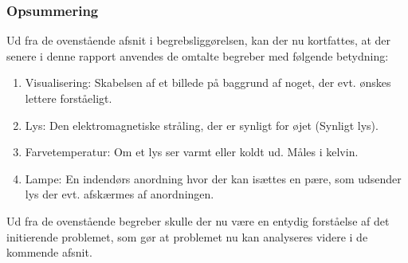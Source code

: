 
\subsubsection*{Opsummering}
Ud fra de ovenstående afsnit i begrebsliggørelsen, kan der nu kortfattes, at der senere i denne rapport anvendes de omtalte begreber med følgende betydning:
\begin{enumerate}
  \item Visualisering: Skabelsen af et billede på baggrund af noget, der evt. ønskes lettere forståeligt.
  \item Lys: Den elektromagnetiske stråling, der er synligt for øjet (Synligt lys).
  \item Farvetemperatur: Om et lys ser varmt eller koldt ud. Måles i kelvin.
  \item Lampe: En indendørs anordning hvor der kan isættes en pære, som udsender lys der evt. afskærmes af anordningen.
\end{enumerate}
Ud fra de ovenstående begreber skulle der nu være en entydig forståelse af det initierende problemet, som gør at problemet nu kan analyseres videre i de kommende afsnit.
